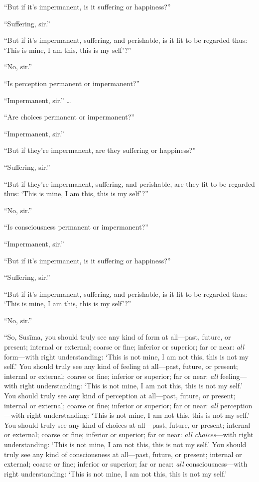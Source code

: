 \documentclass[12pt,openany]{book}%
\begin{document}
“But if it’s impermanent, is it suffering or happiness?” 

“Suffering, sir.” 

“But if it’s impermanent, suffering, and perishable, is it fit to be regarded thus: ‘This is mine, I am this, this is my self’?” 

“No, sir.” 

“Is perception permanent or impermanent?” 

“Impermanent, sir.” … 

“Are choices permanent or impermanent?” 

“Impermanent, sir.” 

“But if they’re impermanent, are they suffering or happiness?” 

“Suffering, sir.” 

“But if they’re impermanent, suffering, and perishable, are they fit to be regarded thus: ‘This is mine, I am this, this is my self’?” 

“No, sir.” 

“Is consciousness permanent or impermanent?” 

“Impermanent, sir.” 

“But if it’s impermanent, is it suffering or happiness?” 

“Suffering, sir.” 

“But if it’s impermanent, suffering, and perishable, is it fit to be regarded thus: ‘This is mine, I am this, this is my self’?” 

“No, sir.” 

“So, \textsanskrit{Susīma}, you should truly see any kind of form at all—past, future, or present; internal or external; coarse or fine; inferior or superior; far or near: \emph{all} form—with right understanding: ‘This is not mine, I am not this, this is not my self.’ You should truly see any kind of feeling at all—past, future, or present; internal or external; coarse or fine; inferior or superior; far or near: \emph{all} feeling—with right understanding: ‘This is not mine, I am not this, this is not my self.’ You should truly see any kind of perception at all—past, future, or present; internal or external; coarse or fine; inferior or superior; far or near: \emph{all} perception—with right understanding: ‘This is not mine, I am not this, this is not my self.’ You should truly see any kind of choices at all—past, future, or present; internal or external; coarse or fine; inferior or superior; far or near: \emph{all choices}—with right understanding: ‘This is not mine, I am not this, this is not my self.’ You should truly see any kind of consciousness at all—past, future, or present; internal or external; coarse or fine; inferior or superior; far or near: \emph{all} consciousness—with right understanding: ‘This is not mine, I am not this, this is not my self.’ 
\end{document}
